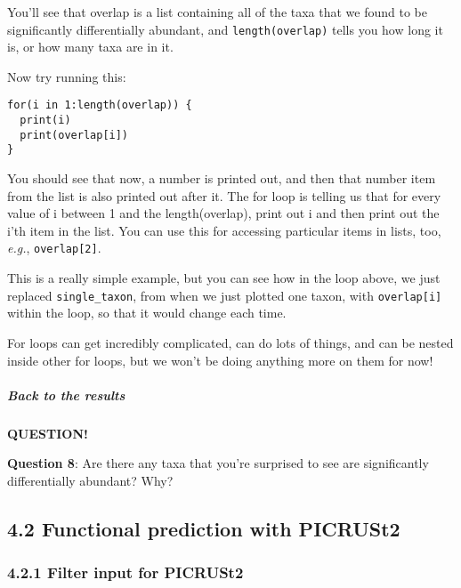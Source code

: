 \documentclass[
]{book}
\newenvironment{bluebox}{
  \definecolor{shadecolor}{RGB}{172, 210, 237}
  \color{white}
  \begin{shaded}}
 {\end{shaded}}
\begin{document}
You'll see that overlap is a list containing all of the taxa that we found to be significantly differentially abundant, and \texttt{length(overlap)} tells you how long it is, or how many taxa are in it.

Now try running this:

\begin{verbatim}
for(i in 1:length(overlap)) {
  print(i)
  print(overlap[i])
}
\end{verbatim}

You should see that now, a number is printed out, and then that number item from the list is also printed out after it. The for loop is telling us that for every value of i between 1 and the length(overlap), print out i and then print out the i'th item in the list. You can use this for accessing particular items in lists, too, \emph{e.g.}, \texttt{overlap{[}2{]}}.

This is a really simple example, but you can see how in the loop above, we just replaced \texttt{single\_taxon}, from when we just plotted one taxon, with \texttt{overlap{[}i{]}} within the loop, so that it would change each time.

For loops can get incredibly complicated, can do lots of things, and can be nested inside other for loops, but we won't be doing anything more on them for now!

\subparagraph{Back to the results}\label{back-to-the-results}

\begin{bluebox}

\begin{center}
\textbf{QUESTION!}

\end{center}

\textbf{Question 8}: Are there any taxa that you're surprised to see are significantly differentially abundant? Why?

\end{bluebox}

\subsection{4.2 Functional prediction with PICRUSt2}\label{functional-prediction-with-picrust2-1}

\subsubsection{4.2.1 Filter input for PICRUSt2}\label{filter-input-for-picrust2}
\end{document}
